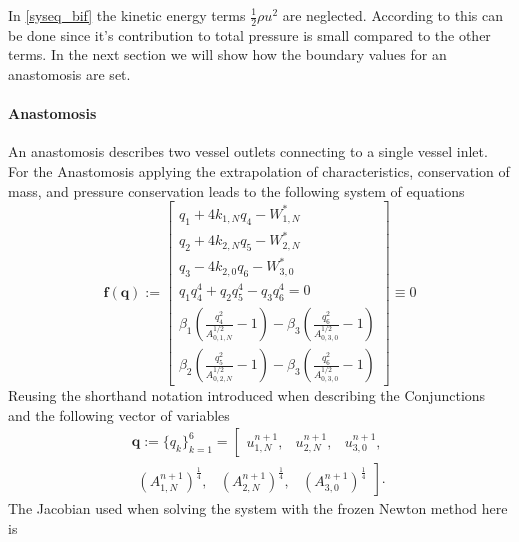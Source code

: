 \documentclass[a4paper, oneside]{discothesis}
\begin{document}
							In \ref{syseq_bif} the kinetic energy terms $\frac{1}{2} \rho u^2$ are neglected.
							According to \cite{Formaggia2003OnedimensionalMF} this can be done since it's contribution to total pressure is small compared to the other terms.
							In the next section we will show how the boundary values for an anastomosis are set.

							\paragraph{Anastomosis} \label{par:anastomosis}
							An anastomosis describes two vessel outlets connecting to a single vessel inlet.
							For the Anastomosis applying the extrapolation of characteristics, conservation of mass, and pressure conservation leads to the following system of equations
							\begin{equation}
								\mathbf{f}(\mathbf{q}):=\left[\begin{array}{c}
										q_{1}+4 k_{1,N} q_{4}-W_{1,N}^* \\
										q_{2}+4 k_{2,N} q_{5}-W_{2,N}^* \\
										q_{3}-4 k_{2,0} q_{6}-W_{3,0}^* \\
										q_{1} q_{4}^4+q_{2} q_{5}^4-q_{3} q_{6}^4=0 \\
										\beta_1\left(\frac{q_{4}^2}{A_{0,1,N}^{1 / 2}}-1\right)-\beta_3\left(\frac{q_{6}^2}{A_{0,3,0}^{1 / 2}}-1\right) \\
										\beta_2\left(\frac{q_{5}^2}{A_{0,2,N}^{1 / 2}}-1\right)-\beta_3\left(\frac{q_{6}^2}{A_{0,3,0}^{1 / 2}}-1\right)
								\end{array}\right] \equiv 0
							\end{equation}
							Reusing the shorthand notation introduced when describing the Conjunctions and the following vector of variables
							\begin{multline}
								\mathbf{q}:=\{q_k\}_{k=1}^6=\left[
									\begin{array}{lll}
										u_{1,N}^{n+1}, & u_{2,N}^{n+1}, & u_{3,0}^{n+1}, 
								\end{array} \right. \\
								\left. \begin{array}{lll}
										\left(A_{1,N}^{n+1}\right)^{\frac{1}{4}}, & \left(A_{2,N}^{n+1}\right)^{\frac{1}{4}}, & \left(A_{3,0}^{n+1}\right)^{\frac{1}{4}}
								\end{array} \right].
							\end{multline}
							The Jacobian used when solving the system with the frozen Newton method here is
\end{document}
